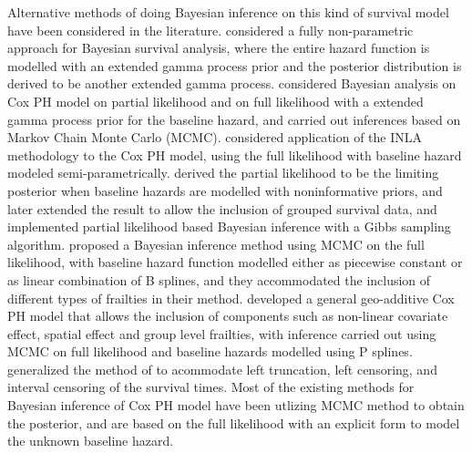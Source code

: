 \documentclass[ba]{imsart}
\begin{document}
Alternative methods of doing Bayesian inference on this kind of survival model have been considered in the literature. \cite{BayesianNonpara} considered a fully non-parametric approach for Bayesian survival analysis, where the entire hazard function is modelled with an extended gamma process prior and the posterior distribution is derived to be another extended gamma process. \cite{BayesianPartialMCMC} considered Bayesian analysis on Cox PH model on partial likelihood and on full likelihood with a extended gamma process prior for the baseline hazard, and carried out inferences based on Markov Chain Monte Carlo (MCMC). \cite{inlacoxph} considered application of the INLA methodology to the Cox PH model, using the full likelihood with baseline hazard modeled semi-parametrically. \cite{PartialandFull1} derived the partial likelihood to be the limiting posterior when baseline hazards are modelled with noninformative priors, and \cite{PartialandFull2} later extended the result to allow the inclusion of grouped survival data, and implemented partial likelihood based Bayesian inference with a Gibbs sampling algorithm. \cite{henschel2009semiparametric} proposed a Bayesian inference method using MCMC on the full likelihood, with baseline hazard function modelled either as piecewise constant or as linear combination of B splines, and they accommodated the inclusion of different types of frailties in their method. \cite{hennerfeind2006geoadditive} developed a general geo-additive Cox PH model that allows the inclusion of components such as non-linear covariate effect, spatial effect and group level frailties, with inference carried out using MCMC on full likelihood and baseline hazards modelled using P splines. \cite{kneib2005geoadditive} generalized the method of \cite{hennerfeind2006geoadditive} to acommodate left truncation, left censoring, and interval censoring of the survival times. Most of the existing methods for Bayesian inference of Cox PH model have been utlizing MCMC method to obtain the posterior, and are based on the full likelihood with an explicit form to model the unknown baseline hazard.
\end{document}
